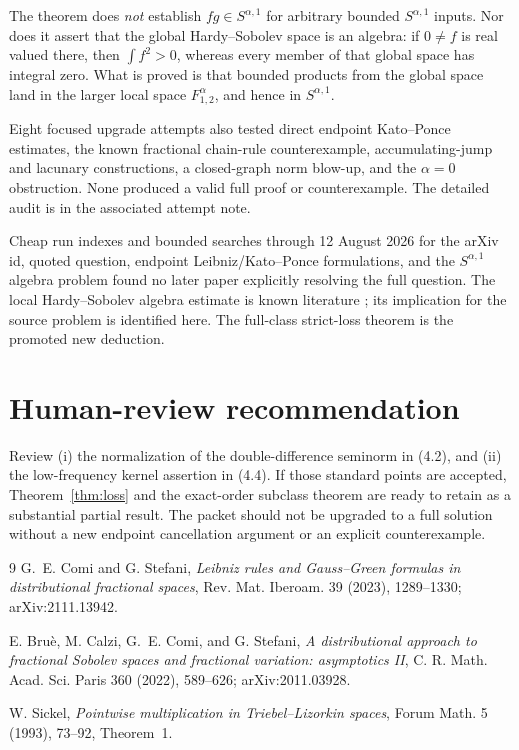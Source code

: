 \documentclass[11pt]{article}
\begin{document}
The theorem does \emph{not} establish $fg\in S^{\alpha,1}$ for arbitrary
bounded $S^{\alpha,1}$ inputs.  Nor does it assert that the global
Hardy--Sobolev space is an algebra: if $0\ne f$ is real valued there, then
$\int f^2>0$, whereas every member of that global space has integral zero.
What is proved is that bounded products from the global space land in the
larger local space $F^\alpha_{1,2}$, and hence in $S^{\alpha,1}$.

Eight focused upgrade attempts also tested direct endpoint Kato--Ponce
estimates, the known fractional chain-rule counterexample, accumulating-jump
and lacunary constructions, a closed-graph norm blow-up, and the
$\alpha=0$ obstruction.  None produced a valid full proof or counterexample.
The detailed audit is in the associated attempt note.

Cheap run indexes and bounded searches through 12 August 2026 for the arXiv
id, quoted question, endpoint Leibniz/Kato--Ponce formulations, and the
$S^{\alpha,1}$ algebra problem found no later paper explicitly resolving the
full question.  The local Hardy--Sobolev algebra estimate is known literature
\cite{Sickel}; its implication for the source problem is identified here.
The full-class strict-loss theorem is the promoted new deduction.

\section{Human-review recommendation}

Review (i) the normalization of the double-difference seminorm in (4.2), and
(ii) the low-frequency kernel assertion in (4.4).  If those standard points
are accepted, Theorem~\ref{thm:loss} and the exact-order subclass theorem are
ready to retain as a substantial partial result.  The packet should not be
upgraded to a full solution without a new endpoint cancellation argument or
an explicit counterexample.

\begin{thebibliography}{9}
G.~E. Comi and G. Stefani,
\emph{Leibniz rules and Gauss--Green formulas in distributional fractional
spaces}, Rev. Mat. Iberoam. 39 (2023), 1289--1330; arXiv:2111.13942.

E. Bru\`e, M. Calzi, G.~E. Comi, and G. Stefani,
\emph{A distributional approach to fractional Sobolev spaces and fractional
variation: asymptotics II}, C. R. Math. Acad. Sci. Paris 360 (2022),
589--626; arXiv:2011.03928.

W. Sickel,
\emph{Pointwise multiplication in Triebel--Lizorkin spaces},
Forum Math. 5 (1993), 73--92, Theorem~1.
\end{thebibliography}
\end{document}

